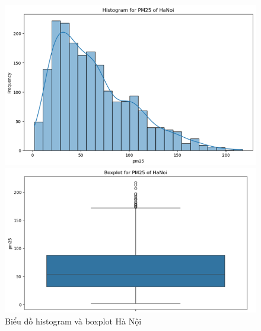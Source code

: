 \begin{figure}[H]
  \centering
  \begin{minipage}{0.22\textwidth}
  \centering
  \end{minipage}
  \hfill

      \begin{minipage}{0.23\textwidth}
      \centering
      \includegraphics[width=1\textwidth]{img/final/Dataset/histogram_hn.png}
      \end{minipage}
      \hfill
      \begin{minipage}{0.24\textwidth}
      \centering
      \includegraphics[width=1\textwidth]{img/final/Dataset/boxplot_hn.png}
      \end{minipage}

  \caption{Biểu đồ histogram và boxplot Hà Nội}
  \label{fig:Random_Forest}
\end{figure}

